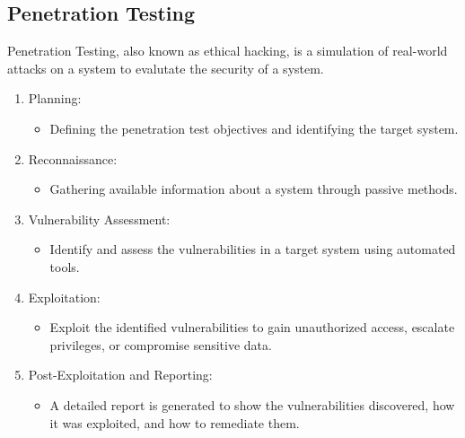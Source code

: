 \subsection{Penetration Testing}
Penetration Testing, also known as ethical hacking, is a simulation of real-world attacks on a system to evalutate the security of a system.
\begin{enumerate}
    \item Planning:
    \begin{itemize}
        \item Defining the penetration test objectives and identifying the target system.
    \end{itemize}
    \item Reconnaissance:
    \begin{itemize}
        \item Gathering available information about a system through passive methods.
    \end{itemize}
    \item Vulnerability Assessment:
    \begin{itemize}
        \item Identify and assess the vulnerabilities in a target system using automated tools.
    \end{itemize}
    \item Exploitation:
    \begin{itemize}
        \item Exploit the identified vulnerabilities to gain unauthorized access, escalate privileges, or compromise sensitive data.
    \end{itemize}
    \item Post-Exploitation and Reporting:
    \begin{itemize}
        \item A detailed report is generated to show the vulnerabilities discovered, how it was exploited, and how to remediate them.
    \end{itemize}
\end{enumerate}
